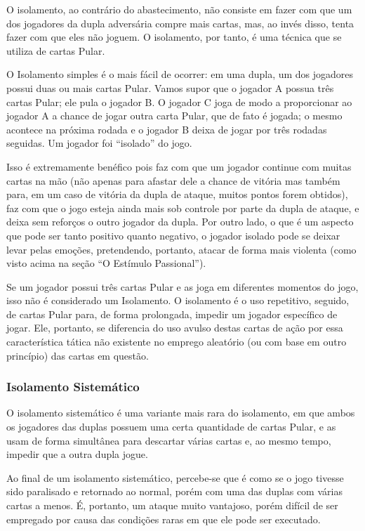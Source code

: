 O isolamento, ao contrário do abastecimento, não consiste em fazer com que um dos jogadores da dupla adversária compre mais cartas, mas, ao invés disso, tenta fazer com que eles não joguem. O isolamento, por tanto, é uma técnica que se utiliza de cartas Pular.

O Isolamento simples é o mais fácil de ocorrer: em uma dupla, um dos jogadores possui duas ou mais cartas Pular. Vamos supor que o jogador A possua três cartas Pular; ele pula o jogador B. O jogador C joga de modo a proporcionar ao jogador A a chance de jogar outra carta Pular, que de fato é jogada; o mesmo acontece na próxima rodada e o jogador B deixa de jogar por três rodadas seguidas. Um jogador foi ``isolado'' do jogo.

Isso é extremamente benéfico pois faz com que um jogador continue com muitas cartas na mão (não apenas para afastar dele a chance de vitória mas também para, em um caso de vitória da dupla de ataque, muitos pontos forem obtidos), faz com que o jogo esteja ainda mais sob controle por parte da dupla de ataque, e deixa sem reforços o outro jogador da dupla. Por outro lado, o que é um aspecto que pode ser tanto positivo quanto negativo, o jogador isolado pode se deixar levar pelas emoções, pretendendo, portanto, atacar de forma mais violenta (como visto acima na seção ``O Estímulo Passional'').

Se um jogador possui três cartas Pular e as joga em diferentes momentos do jogo, isso não é considerado um Isolamento. O isolamento é o uso repetitivo, seguido, de cartas Pular para, de forma prolongada, impedir um jogador específico de jogar. Ele, portanto, se diferencia do uso avulso destas cartas de ação por essa característica tática não existente no emprego aleatório (ou com base em outro princípio) das cartas em questão.

\subsubsection{Isolamento Sistemático}

O isolamento sistemático é uma variante mais rara do isolamento, em que ambos os jogadores das duplas possuem uma certa quantidade de cartas Pular, e as usam de forma simultânea para descartar várias cartas e, ao mesmo tempo, impedir que a outra dupla jogue.

Ao final de um isolamento sistemático, percebe-se que é como se o jogo tivesse sido paralisado e retornado ao normal, porém com uma das duplas com várias cartas a menos. É, portanto, um ataque muito vantajoso, porém difícil de ser empregado por causa das condições raras em que ele pode ser executado.

